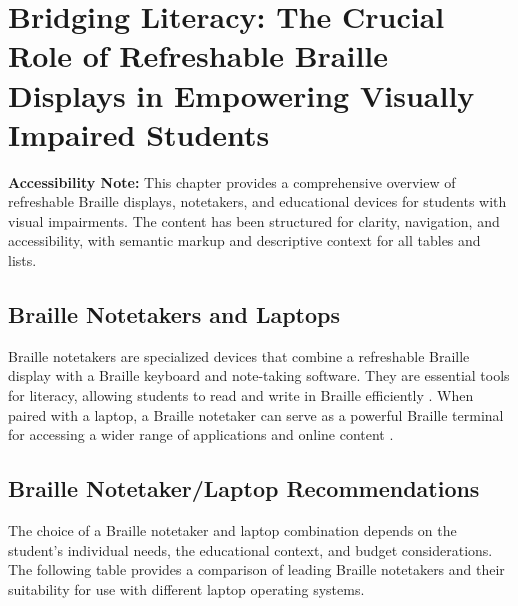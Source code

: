 \chapter{Bridging Literacy: The Crucial Role of Refreshable Braille Displays in Empowering Visually Impaired Students}\label{ch3:braille}
\raggedright

\begin{raggedright}
	\textbf{Accessibility Note:} This chapter provides a comprehensive overview of refreshable Braille displays, notetakers, and educational devices for students with visual impairments. The content has been structured for clarity, navigation, and accessibility, with semantic markup and descriptive context for all tables and lists.
\end{raggedright}

\section{Braille Notetakers and Laptops}\label{ch3:sec:notetakers-laptops}
Braille notetakers are specialized devices that combine a refreshable Braille display with a Braille keyboard and note-taking software. They are essential tools for literacy, allowing students to read and write in Braille efficiently \supercite{Holbrook2006}. When paired with a laptop, a Braille notetaker can serve as a powerful Braille terminal for accessing a wider range of applications and online content \supercite{Kelly2011}.

\section{Braille Notetaker/Laptop Recommendations}\label{ch3:sec:notetaker-laptop-recs}
The choice of a Braille notetaker and laptop combination depends on the student's individual needs, the educational context, and budget considerations. The following table provides a comparison of leading Braille notetakers and their suitability for use with different laptop operating systems.

